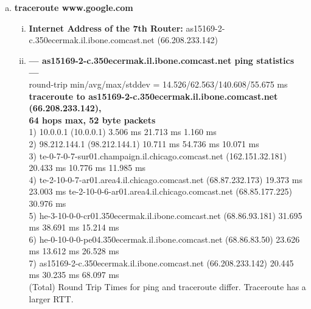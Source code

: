 \documentclass[11pt]{article}
\begin{document}
\begin{enumerate}[1]
\begin{enumerate}[(a)]
  \item \textbf{traceroute www.google.com}
    \begin{enumerate}[i)]
      \item \textbf{Internet Address of the 7th Router:} 
      as15169-2-c.350ecermak.il.ibone.comcast.net (66.208.233.142)
      \item \textbf{--- as15169-2-c.350ecermak.il.ibone.comcast.net ping statistics ---} \\
        round-trip min/avg/max/stddev = 14.526/62.563/140.608/55.675 ms \\

        \textbf{traceroute to as15169-2-c.350ecermak.il.ibone.comcast.net (66.208.233.142),\\ 64 hops max, 52 byte packets} \\
         1)  10.0.0.1 (10.0.0.1)  3.506 ms  21.713 ms  1.160 ms \\
         2)  98.212.144.1 (98.212.144.1)  10.711 ms  54.736 ms  10.071 ms \\
         3)  te-0-7-0-7-sur01.champaign.il.chicago.comcast.net (162.151.32.181)  20.433 ms  10.776 ms   11.985 ms \\
         4)  te-2-10-0-7-ar01.area4.il.chicago.comcast.net (68.87.232.173)  19.373 ms  23.003 ms
            te-2-10-0-6-ar01.area4.il.chicago.comcast.net (68.85.177.225)  30.976 ms \\
         5)  he-3-10-0-0-cr01.350ecermak.il.ibone.comcast.net (68.86.93.181)  31.695 ms  38.691 ms  15.214 ms \\
         6)  he-0-10-0-0-pe04.350ecermak.il.ibone.comcast.net (68.86.83.50)  23.626 ms  13.612 ms  26.528 ms \\
         7)  as15169-2-c.350ecermak.il.ibone.comcast.net (66.208.233.142)  20.445 ms  30.235 ms  68.097 ms \\

         (Total) Round Trip Times for ping and traceroute differ. Traceroute has a larger RTT.
    \end{enumerate}
  \end{enumerate}
\end{enumerate}
\end{document}
